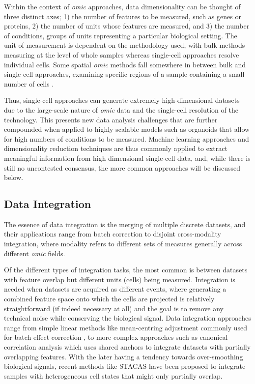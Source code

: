 Within the context of \emph{omic} approaches, data dimensionality can be thought of three distinct axes; 1) the number of features to be measured, such as genes or proteins, 2) the number of units whose features are measured, and 3) the number of conditions, groups of units representing a particular biological setting. 
The unit of measurement is dependent on the methodology used, with bulk methods measuring at the level of whole samples whereas single-cell approaches resolve individual cells. Some spatial \emph{omic} methods fall somewhere in between bulk and single-cell approaches, examining specific regions of a sample containing a small number of cells \cite{vickovic_high-definition_2019,marx_method_2021, williams_introduction_2022}.

Thus, single-cell approaches can generate extremely high-dimensional datasets due to the large-scale nature of \emph{omic} data and the single-cell resolution of the technology. This presents new data analysis challenges that are further compounded when applied to highly scalable models such as organoids that allow for high numbers of conditions to be measured. Machine learning approaches and dimensionality reduction techniques are thus commonly applied to extract meaningful information from high dimensional single-cell data, and, while there is still no uncontested consensus, the more common approaches will be discussed below.


\subsection{Data Integration}

The essence of data integration is the merging of multiple discrete datasets, and their applications range from batch correction to disjoint cross-modality integration, where modality refers to different sets of measures generally across different \emph{omic} fields.

Of the different types of integration tasks, the most common is between datasets with feature overlap but different units (cells) being measured. Integration is needed when datasets are acquired as different events, where generating a combined feature space onto which the cells are projected is relatively straightforward (if indeed necessary at all) and the goal is to remove any technical noise while conserving the biological signal. Data integration approaches range from simple linear methods like mean-centring adjustment commonly used for batch effect correction \cite{hornung_combining_2016}, to more complex approaches such as canonical correlation analysis \cite{butler_integrating_2018} which uses shared anchors to integrate datasets with partially overlapping features. With the later having a tendency towards over-smoothing biological signals, recent methods like STACAS \cite{andreatta_stacas_2021} have been proposed to integrate samples with heterogeneous cell states that might only partially overlap.

